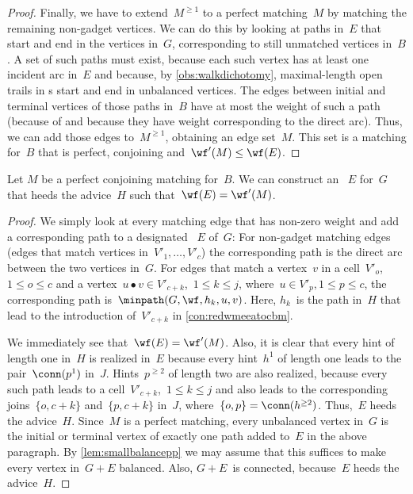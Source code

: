 \begin{proof}
Finally, we have to extend~$M^{\geq 1}$ to a perfect matching~$M$ by matching the remaining non-gadget vertices. We can do this by looking at paths in~$E$ that start and end in the vertices in~$G$, corresponding to still unmatched vertices in~$B$. A set of such paths must exist, because each such vertex has at least one incident arc in~$E$ and because, by \autoref{obs:walkdichotomy}, maximal-length open trails in \EE s start and end in unbalanced vertices. The edges between initial and terminal vertices of those paths in~$B$ have at most the weight of such a path (because of \SPP{} and because they have weight corresponding to the direct arc). Thus, we can add those edges to~$M^{\geq 1}$, obtaining an edge set~$M$. This set is a matching for~$B$ that is perfect, conjoining and~$\wf'(M) \leq \wf(E)$.
\end{proof}
\begin{lemma}
  \label{lem:redwmeeatocbmbacktransfer}
  Let $M$ be a perfect conjoining matching for~$B$. We can construct an \EE{}~$E$ for~$G$ that heeds the advice~$H$ such that~$\wf(E) = \wf'(M)$.
\end{lemma}
\begin{proof}
  We simply look at every matching edge that has non-zero weight and add a corresponding path to a designated \EE{}~$E$ of~$G$: For non-gadget matching edges (edges that match vertices in~$V'_1, \ldots, V'_c$) the corresponding path is the direct arc between the two vertices in~$G$. For edges that match a vertex~$v$ in a cell~$V'_o$,~$1 \leq o \leq c$ and a vertex~$u \bullet v \in V'_{c + k}$,~$1 \leq k \leq j$, where~$u \in V'_p, 1 \leq p \leq c$, the corresponding path is~$\minpath(G, \wf, h_k, u, v)$. Here, $h_k$~is the path in~$H$ that lead to the introduction of~$V'_{c+k}$ in \autoref{con:redwmeeatocbm}.



  We immediately see that~$\wf(E) = \wf'(M)$. Also, it is clear that every hint of length one in~$H$ is realized in~$E$ because every hint~$h^1$ of length one leads to the pair~$\conn(p^1)$ in~$J$. Hints~$p^{\geq2}$ of length two are also realized, because every such path leads to a cell~$V'_{c + k}$,~$1 \leq k \leq j$ and also leads to the corresponding joins~$\{o, c+k\}$ and~$\{p, c+k\}$ in~$J$, where~$\{o, p\} = \conn(h^{\geq 2})$. Thus,~$E$ heeds the advice~$H$. Since~$M$ is a perfect matching, every unbalanced vertex in~$G$ is the initial or terminal vertex of exactly one path added to~$E$ in the above paragraph. By \autoref{lem:smallbalancepp} we may assume that this suffices to make every vertex in~$G + E$ balanced. Also, $G + E$~is connected, because~$E$ heeds the advice~$H$.
\end{proof}
